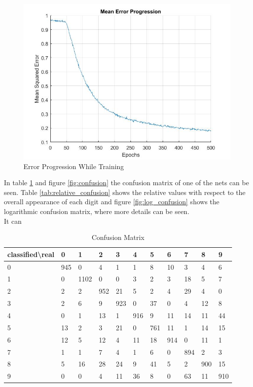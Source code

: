 \documentclass[paper=a4, fontsize=11pt]{scrartcl} %
\numberwithin{equation}{section} %
\numberwithin{figure}{section} %
\numberwithin{table}{section} %
\begin{document}
\begin{figure}[H]
	\centering
	\includegraphics[width = 0.6\linewidth]{./errorProgression.jpg}
	\caption{Error Progression While Training}
	\label{fig:error}
\end{figure}

In table \ref{tab:confusion} and figure \ref{fig:confusion} the confusion matrix of one of the nets can be seen. Table \ref{tab:relative_confusion} shows the relative values with respect to the overall appearance of each digit and figure \ref{fig:log_confusion} shows the logarithmic confusion matrix, where more details can be seen.\\

It can

\begin{table}[H]
\centering
\caption{Confusion Matrix}
\label{tab:confusion}
\begin{tabular}{|l||llllllllll|}
\hline
classified\textbackslash real & 0 & 1 & 2 & 3 & 4 & 5 & 6 & 7 & 8 & 9 \\ \hline\hline
0 & 945 & 0 & 4 & 1 & 1 & 8 & 10 & 3 & 4 & 6 \\ \hline
1 & 0 & 1102 & 0 & 0 & 3 & 2 & 3 & 18 & 5 & 7 \\ \hline
2 & 2 & 2 & 952 & 21 & 5 & 2 & 4 & 29 & 4 & 0 \\ \hline
3 & 2 & 6 & 9 & 923 & 0 & 37 & 0 & 4 & 12 & 8 \\ \hline
4 & 0 & 1 & 13 & 1 & 916 & 9 & 11 & 14 & 11 & 44 \\ \hline
5 & 13 & 2 & 3 & 21 & 0 & 761 & 11 & 1 & 14 & 15 \\ \hline
6 & 12 & 5 & 12 & 4 & 11 & 18 & 914 & 0 & 11 & 1 \\ \hline
7 & 1 & 1 & 7 & 4 & 1 & 6 & 0 & 894 & 2 & 3 \\ \hline
8 & 5 & 16 & 28 & 24 & 9 & 41 & 5 & 2 & 900 & 15 \\ \hline
9 & 0 & 0 & 4 & 11 & 36 & 8 & 0 & 63 & 11 & 910 \\ \hline
\end{tabular}
\end{table}
\end{document}
